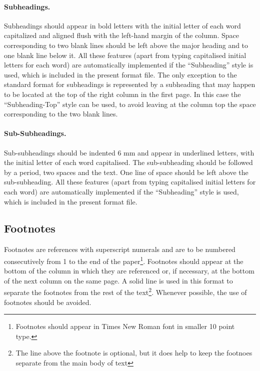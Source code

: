 \documentclass[bibtex,pagenumbers]{stabs2021}
\begin{document}
\paragraph{Subheadings.}

Subheadings should appear in bold letters with the initial letter of
each word capitalized and aligned flush with the left-hand margin of
the column. Space corresponding to two blank lines should be left
above the major heading and to one blank line below it. All these
features (apart from typing capitalised initial letters for each word)
are automatically implemented if the ``Subheading'' style is used,
which is included in the present format file. The only exception to
the standard format for subheadings is represented by a subheading
that may happen to be located at the top of the right column in the
first page. In this case the ``Subheading-Top'' style can be used, to
avoid leaving at the column top the space corresponding to the two
blank lines.

\paragraph{Sub-Subheadings.}

Sub-subheadings should be indented 6 mm and appear in underlined
letters, with the initial letter of each word capitalised. The
sub-subheading should be followed by a period, two spaces and the
text. One line of space should be left above the sub-subheading. All
these features (apart from typing capitalised initial letters for
each word) are automatically implemented if the ``Subheading'' style
is used, which is included in the present format file.

\subsection{Footnotes}

Footnotes are references with superscript numerals and are to be
numbered consecutively from 1 to the end of the
paper\footnote{Footnotes should appear in Times New Roman font in
  smaller 10 point type.}. Footnotes should appear at the bottom of
the column in which they are referenced or, if necessary, at the
bottom of the next column on the same page. A solid line is used in
this format to separate the footnotes from the rest of the
text\footnote{The line above the footnote is optional, but it does
  help to keep the footnoes separate from the main body of
  text}. Whenever possible, the use of footnotes should be avoided.
\end{document}
